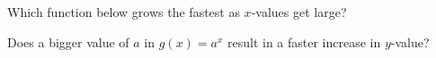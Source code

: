 \documentclass{ximera}
\begin{document}
\begin{question}
Which function below grows the fastest as $x$-values get large?

    \begin{multipleChoice}
    \end{multipleChoice}
    \begin{hint}
      Does a bigger value of $a$ in $g(x)=a^x$ result in a faster increase in $y$-value?
    \end{hint}

\end{question}
\end{document}
